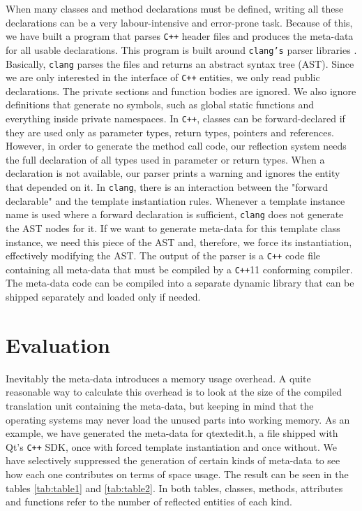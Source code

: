 When many classes and method declarations must be defined, writing all these declarations can be a very
labour-intensive and error-prone task. Because of this, we have built a program that parses \texttt{C++}
header files and produces the meta-data for all usable declarations. This program is built around \texttt{clang's}
parser libraries \cite{clang}. Basically, \texttt{clang} parses the files and returns an abstract syntax tree (AST).
Since we are only interested in the interface of \texttt{C++} entities, we only read public declarations. The
private sections and function bodies are ignored. We also ignore definitions that generate no symbols, such as
global static functions and everything inside private namespaces. In \texttt{C++}, classes can be forward-declared
if they are used only as parameter types, return types, pointers and references. However, in order to generate the
method call code, our reflection system needs the full declaration of all types used in parameter or return types.
When a declaration is not available, our parser prints a warning and ignores the entity that depended on it. In
\texttt{clang}, there is an interaction between the "forward declarable" and the template instantiation rules.
Whenever a template instance name is used where a forward declaration is sufficient, \texttt{clang} does not
generate the AST nodes for it. If we want to generate meta-data for this template class instance, we need this
piece of the AST and, therefore, we force its instantiation, effectively modifying the AST. The output of the
parser is a \texttt{C++} code file containing all meta-data that must be compiled by a \texttt{C++}11 conforming
compiler. The meta-data code can be compiled into a separate dynamic library that can be shipped separately and
loaded only if needed.


\section{Evaluation}
\label{evaluation}

Inevitably the meta-data introduces a memory usage overhead. A quite reasonable way to
calculate this overhead is to look at the size of the compiled translation unit containing the meta-data, but keeping in mind that
the operating systems may never load the unused parts into working memory. As an example, we have
generated the meta-data for qtextedit.h, a file shipped with Qt's \texttt{C++} SDK, once with forced template instantiation
and once without. We have selectively suppressed the generation of certain kinds of meta-data to see how each one contributes
on terms of space usage. The result can be seen in the tables \ref{tab:table1} and \ref{tab:table2}.
In both tables, classes, methods, attributes and functions refer to the number of reflected entities of each kind.

